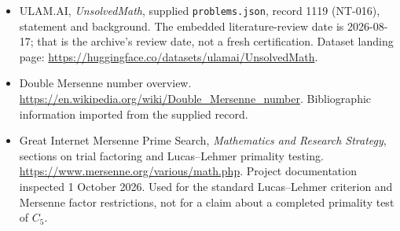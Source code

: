 \documentclass[11pt,a4paper]{article}
\begin{document}
{\small

\begin{itemize}

\item[\hypertarget{source:1119:1}{S1}] ULAM.AI, \emph{UnsolvedMath}, supplied \texttt{problems.json}, record 1119 (NT-016), statement and background. The embedded literature-review date is 2026-08-17; that is the archive’s review date, not a fresh certification. Dataset landing page: \url{https://huggingface.co/datasets/ulamai/UnsolvedMath}.

\item[\hypertarget{source:1119:2}{S2}] Double Mersenne number overview. \url{https://en.wikipedia.org/wiki/Double_Mersenne_number}. Bibliographic information imported from the supplied record.


\item[E1] Great Internet Mersenne Prime Search,
\emph{Mathematics and Research Strategy}, sections on trial factoring
and Lucas--Lehmer primality testing.
\url{https://www.mersenne.org/various/math.php}.
Project documentation inspected 1 October 2026. Used for the standard
Lucas--Lehmer criterion and Mersenne factor restrictions, not for a
claim about a completed primality test of $C_5$.

\end{itemize}

}

\label{end:1119}
\end{document}
